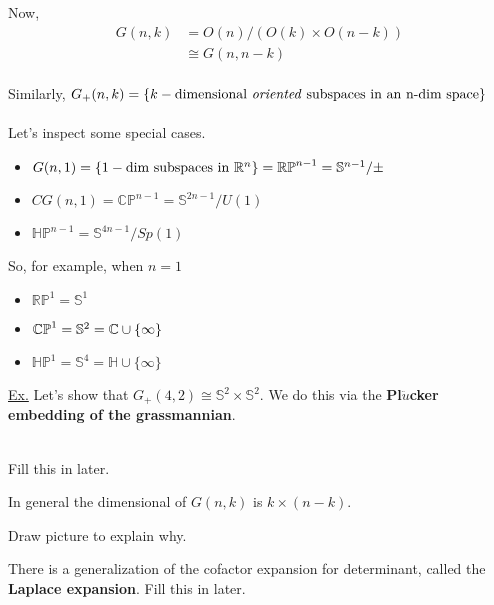 \documentclass[11pt]{article}
\begin{document}
Now,
\begin{align*}
  G(n, k) &= O(n) / (O(k) \times O(n-k)) \\
  &\cong G(n, n-k)
\end{align*}
\\
Similarly, $G_+(n, k) = \{ k-\text{dimensional \emph{oriented} subspaces in an n-dim space} \}$
\\
\\
Let's inspect some special cases. 
\begin{itemize}
  \item $G(n, 1) = \{1-\text{dim subspaces in }\mathbb{R}^n\} = \mathbb{RP}^{n-1} = \mathbb{S}^{n-1}/\pm$ 
  \item $CG(n, 1) = \mathbb{CP}^{n-1} = \mathbb{S}^{2n-1} / U(1)$ 
  \item $\mathbb{HP}^{n-1} = \mathbb{S}^{4n-1} / Sp(1)$
\end{itemize}
So, for example, when $n = 1$
\begin{itemize}
  \item $\mathbb{RP}^1 = \mathbb{S}^1$
  \item $\mathbb{CP}^1 = \mathbb{S}^2 = \mathbb{C} \cup \{\infty\}$
  \item $\mathbb{HP}^1 = \mathbb{S}^4 = \mathbb{H} \cup \{\infty\}$
\end{itemize}

\begin{dottedbox}
  \underline{Ex.} Let's show that $G_+(4, 2) \cong \mathbb{S}^2 \times \mathbb{S}^2$. We do this via the \textbf{Pl$\ddot{u}$cker embedding of the grassmannian}.
  \\
  \\
  \begin{note}
    {Fill this in later.}
  \end{note}
\end{dottedbox}

\begin{bluebox}
  In general the dimensional of $G(n,k)$ is $k \times (n-k)$. \begin{note}
    {Draw picture to explain why.}
  \end{note}
\end{bluebox}

\begin{dottedbox}
  There is a generalization of the cofactor expansion for determinant, called the \textbf{Laplace expansion}. Fill this in later.
\end{dottedbox}
\end{document}
